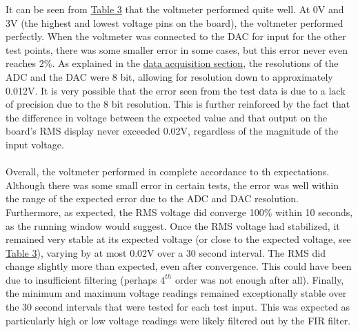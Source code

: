 \documentclass[12pt]{report}
\begin{document}
It can be seen from \hyperref[testdata]{Table 3} that the voltmeter performed quite well. At 0V and 3V (the
highest and lowest voltage pins on the board), the voltmeter performed perfectly. When the voltmeter
was connected to the DAC for input for the other test points, there was some smaller error in some
cases, but this error never even reaches $2\%$. As explained in the \hyperref[dataaq]{data
acquisition section}, the resolutions of the ADC and the DAC were 8 bit, allowing for resolution
down to approximately 0.012V. It is very possible that the error seen from the test data is due to a
lack of precision due to the 8 bit resolution. This is further reinforced by the fact that the
difference in voltage between the expected value and that output on the board's RMS display never
exceeded 0.02V, regardless of the magnitude of the input voltage.\\\\
Overall, the voltmeter performed in complete accordance to th expectations. Although there was some
small error in certain tests, the error was well within the range of the expected error due to the
ADC and DAC resolution. Furthermore, as expected, the RMS voltage did converge 100\% within 10
seconds, as the running window would suggest. Once the RMS voltage had stabilized, it remained very
stable at its expected voltage (or close to the expected voltage, see \hyperref[testdata]{Table 3}),
varying by at most 0.02V over a 30 second interval. The RMS did change slightly more than expected,
even after convergence. This could have been due to insufficient filtering (perhaps $4^{th}$ order
was not enough after all). Finally, the minimum and maximum voltage readings remained exceptionally
stable over the 30 second intervals that were tested for each test input. This was expected as
particularly high or low voltage readings were likely filtered out by the FIR filter.
\end{document}
